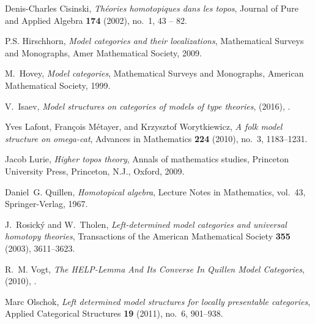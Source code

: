 \documentclass{tac}
\theoremstyle{definition}
\begin{document}
\begin{references*}

Denis-Charles Cisinski, \emph{Théories homotopiques dans les topos}, Journal
  of Pure and Applied Algebra \textbf{174} (2002), no.~1, 43 -- 82.

P.S. Hirschhorn, \emph{Model categories and their localizations}, Mathematical
  Surveys and Monographs, Amer Mathematical Society, 2009.

M.~Hovey, \emph{Model categories}, Mathematical Surveys and Monographs,
  American Mathematical Society, 1999.

V.~{Isaev}, \emph{Model structures on categories of models of type theories},
  (2016), \href {http://arxiv.org/abs/1607.07407} {}.

Yves Lafont, Fran{\c c}ois M{\'e}tayer, and Krzysztof Worytkiewicz, \emph{{A
  folk model structure on omega-cat}}, Advances in Mathematics \textbf{224}
  (2010), no.~3, 1183--1231.

Jacob Lurie, \emph{Higher topos theory}, Annals of mathematics studies,
  Princeton University Press, Princeton, N.J., Oxford, 2009.

Daniel~G. Quillen, \emph{Homotopical algebra}, Lecture Notes in Mathematics,
  vol.~43, Springer-Verlag, 1967.

J.~Rosick{\'y} and W.~Tholen, \emph{Left-determined model categories and
  universal homotopy theories}, Transactions of the American Mathematical
  Society \textbf{355} (2003), 3611--3623.

R.~M. Vogt, \emph{{The HELP-Lemma And Its Converse In Quillen Model
  Categories}},  (2010), \href {http://arxiv.org/abs/1004.5249}
  {}.

Marc Olschok, \emph{Left determined model structures for locally presentable
  categories}, Applied Categorical Structures \textbf{19} (2011), no.~6,
  901--938.

\end{references*}
\end{document}
